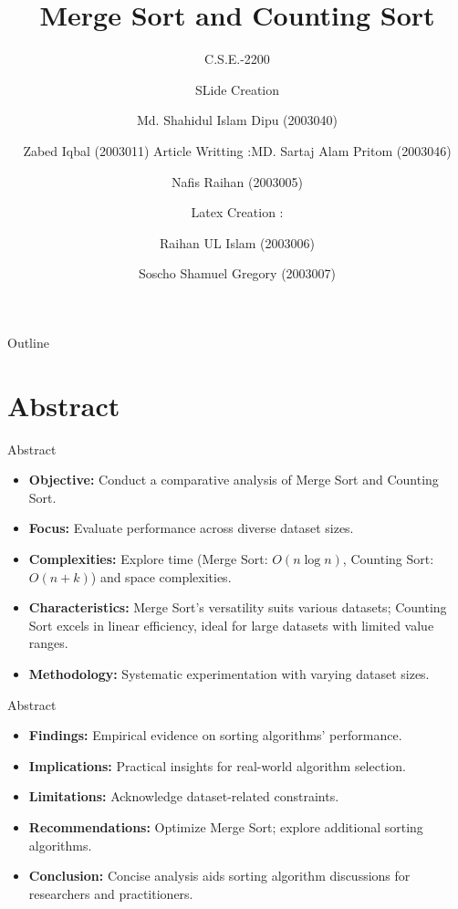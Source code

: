 \documentclass{beamer}
\title{Merge Sort and Counting Sort}
\subtitle{C.S.E.-2200}
\author[Md. Shahidul Islam Dipu \and Zabed Iqbal]{SLide Creation \newline\and Md. Shahidul Islam Dipu (2003040) \newline\and Zabed Iqbal (2003011)
	\newline Article Writting :\newline MD. Sartaj Alam Pritom 
	(2003046) 
	\newline\and Nafis Raihan (2003005)
	\newline\and Latex Creation : 
	\newline\and Raihan UL Islam (2003006)
	\newline\and Soscho Shamuel Gregory (2003007)

}
\begin{document}
	
	\begin{frame}
		\titlepage
	\end{frame}
	
	\begin{frame}{Outline}
		\tableofcontents
	\end{frame}
	
	\section{Abstract}
	
	\begin{frame}{Abstract}
		\begin{itemize}
			\item \textbf{Objective:} Conduct a comparative analysis of Merge Sort and Counting Sort.
			
			\item \textbf{Focus:} Evaluate performance across diverse dataset sizes.
			
			\item \textbf{Complexities:} Explore time (Merge Sort: $O(n \log n)$, Counting Sort: $O(n + k)$) and space complexities.
			
			\item \textbf{Characteristics:} Merge Sort's versatility suits various datasets; Counting Sort excels in linear efficiency, ideal for large datasets with limited value ranges.
			
			\item \textbf{Methodology:} Systematic experimentation with varying dataset sizes.\cite{researchgate}
		\end{itemize}
	\end{frame}
	
	\begin{frame}{Abstract}
		\begin{itemize}
			\item \textbf{Findings:} Empirical evidence on sorting algorithms' performance.
			
			\item \textbf{Implications:} Practical insights for real-world algorithm selection.
			
			\item \textbf{Limitations:} Acknowledge dataset-related constraints.
			
			\item \textbf{Recommendations:} Optimize Merge Sort; explore additional sorting algorithms.
			
			\item \textbf{Conclusion:} Concise analysis aids sorting algorithm discussions for researchers and practitioners.
		\end{itemize}
	\end{frame}
	
\end{document}

